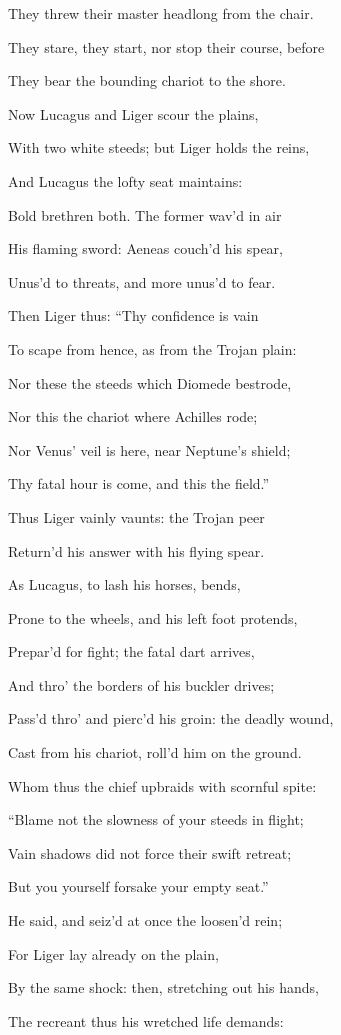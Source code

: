 They threw their master headlong from the chair.

They stare, they start, nor stop their course, before

They bear the bounding chariot to the shore.

Now Lucagus and Liger scour the plains,

With two white steeds; but Liger holds the reins,

And Lucagus the lofty seat maintains:

Bold brethren both. The former wav’d in air

His flaming sword: Aeneas couch’d his spear,

Unus’d to threats, and more unus’d to fear.

Then Liger thus: “Thy confidence is vain

To scape from hence, as from the Trojan plain:

Nor these the steeds which Diomede bestrode,

Nor this the chariot where Achilles rode;

Nor Venus’ veil is here, near Neptune’s shield;

Thy fatal hour is come, and this the field.”

Thus Liger vainly vaunts: the Trojan peer

Return’d his answer with his flying spear.

As Lucagus, to lash his horses, bends,

Prone to the wheels, and his left foot protends,

Prepar’d for fight; the fatal dart arrives,

And thro’ the borders of his buckler drives;

Pass’d thro’ and pierc’d his groin: the deadly wound,

Cast from his chariot, roll’d him on the ground.

Whom thus the chief upbraids with scornful spite:

“Blame not the slowness of your steeds in flight;

Vain shadows did not force their swift retreat;

But you yourself forsake your empty seat.”

He said, and seiz’d at once the loosen’d rein;

For Liger lay already on the plain,

By the same shock: then, stretching out his hands,

The recreant thus his wretched life demands:

